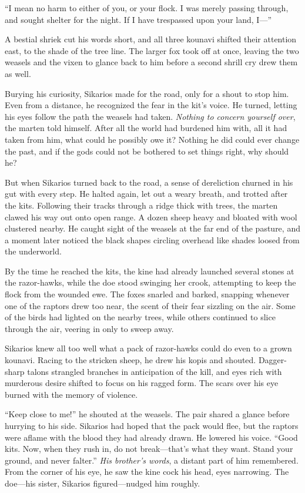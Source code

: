 ``I mean no harm to either of you, or your flock. I was merely passing through, and sought shelter for the night. If I have trespassed upon your land, I---''

A bestial shriek cut his words short, and all three kounavi shifted their attention east, to the shade of the tree line. The larger fox took off at once, leaving the two weasels and the vixen to glance back to him before a second shrill cry drew them as well.

Burying his curiosity, Sikarios made for the road, only for a shout to stop him. Even from a distance, he recognized the fear in the kit's voice. He turned, letting his eyes follow the path the weasels had taken. \emph{Nothing to concern yourself over}, the marten told himself. After all the world had burdened him with, all it had taken from him, what could he possibly owe it? Nothing he did could ever change the past, and if the gods could not be bothered to set things right, why should he?

But when Sikarios turned back to the road, a sense of dereliction churned in his gut with every step. He halted again, let out a weary breath, and trotted after the kits. Following their tracks through a ridge thick with trees, the marten clawed his way out onto open range. A dozen sheep heavy and bloated with wool clustered nearby. He caught sight of the weasels at the far end of the pasture, and a moment later noticed the black shapes circling overhead like shades loosed from the underworld.

By the time he reached the kits, the kine had already launched several stones at the razor-hawks, while the doe stood swinging her crook, attempting to keep the flock from the wounded ewe. The foxes snarled and barked, snapping whenever one of the raptors drew too near, the scent of their fear sizzling on the air. Some of the birds had lighted on the nearby trees, while others continued to slice through the air, veering in only to sweep away.

Sikarios knew all too well what a pack of razor-hawks could do even to a grown kounavi. Racing to the stricken sheep, he drew his kopis and shouted. Dagger-sharp talons strangled branches in anticipation of the kill, and eyes rich with murderous desire shifted to focus on his ragged form. The scars over his eye burned with the memory of violence.

``Keep close to me!'' he shouted at the weasels. The pair shared a glance before hurrying to his side. Sikarios had hoped that the pack would flee, but the raptors were aflame with the blood they had already drawn. He lowered his voice. ``Good kits. Now, when they rush in, do not break---that's what they want. Stand your ground, and never falter.'' \emph{His brother's words}, a distant part of him remembered. From the corner of his eye, he saw the kine cock his head, eyes narrowing. The doe---his sister, Sikarios figured---nudged him roughly.


